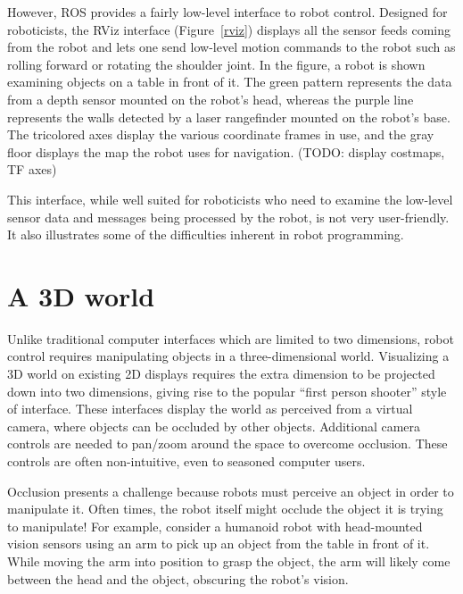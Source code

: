 \documentclass[11pt,twocolumn]{article}
\begin{document}
However, ROS provides a fairly low-level interface to robot control. Designed for roboticists, the RViz interface (Figure~\ref{rviz}) displays all the sensor feeds coming from the robot and lets one send low-level motion commands to the robot such as rolling forward or rotating the shoulder joint. In the figure, a robot is shown examining objects on a table in front of it. The green pattern represents the data from a depth sensor mounted on the robot's head, whereas the purple line represents the walls detected by a laser rangefinder mounted on the robot's base. The tricolored axes display the various coordinate frames in use, and the gray floor displays the map the robot uses for navigation. (TODO: display costmaps, TF axes)

This interface, while well suited for roboticists who need to examine the low-level sensor data and messages being processed by the robot, is not very user-friendly. It also illustrates some of the difficulties inherent in robot programming.

\section{A 3D world}


Unlike traditional computer interfaces which are limited to two dimensions, robot control requires manipulating objects in a three-dimensional world. Visualizing a 3D world on existing 2D displays requires the extra dimension to be projected down into two dimensions, giving rise to the popular ``first person shooter'' style of interface. These interfaces display the world as perceived from a virtual camera, where objects can be occluded by other objects. Additional camera controls are needed to pan/zoom around the space to overcome occlusion. These controls are often non-intuitive, even to seasoned computer users.

Occlusion presents a challenge because robots must perceive an object in order to manipulate it.  Often times, the robot itself might occlude the object it is trying to manipulate! For example, consider a humanoid robot with head-mounted vision sensors using an arm to pick up an object from the table in front of it. While moving the arm into position to grasp the object, the arm will likely come between the head and the object, obscuring the robot's vision.
\end{document}
